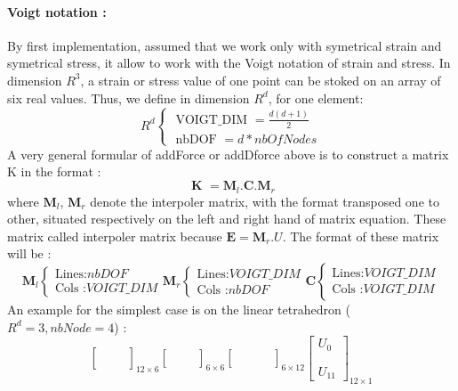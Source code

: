 \documentclass[a4paper,10pt]{article}
\begin{document}
\paragraph{Voigt notation :} By first implementation, assumed that we work only with symetrical strain and symetrical stress, it allow to work with the Voigt notation of strain and stress. In dimension $R^3$, a strain or stress value of one point can be stoked on an array of six real values. Thus, we define in dimension $R^d$, for one element:
\[
R^d
\left\{ 
\begin{array}{l}
 \text{ VOIGT\_DIM }   = \frac{d(d+1)}{2} \\
 \text{ nbDOF      }   = d*nbOfNodes  
\end{array}\right.
\]
A very general formular of addForce or addDforce above is to construct a matrix K in the format : 
\[
 \textbf{ K }   = \textbf{M}_l  . \textbf{C} . \textbf{M}_r
\]
where $\textbf{M}_l$, $\textbf{M}_r$ denote the interpoler matrix, with the format transposed one to other, situated respectively on the left and right hand of matrix equation. These matrix called interpoler matrix because $\textbf{E}=\textbf{M}_r.U$. The format of these matrix will be :
\[
\textbf{M}_l 
\left\{ 
\begin{array}{l}
\text{Lines:}       nbDOF        \\
\text{Cols :}       VOIGT\_DIM
\end{array}\right.
\textbf{M}_r 
\left\{ 
\begin{array}{l}
\text{Lines:}       VOIGT\_DIM  \\
\text{Cols :}       nbDOF
\end{array}\right.
\textbf{C} 
\left\{ 
\begin{array}{l}
\text{Lines:}       VOIGT\_DIM \\
\text{Cols :}       VOIGT\_DIM
\end{array}\right.
\]
An example for the simplest case is on the linear tetrahedron ($R^d=3, nbNode=4$) :
\[
\left[ 
\begin{array}{ccc}
  &  &     \\
  &  &     \\
  &  &     \\
  &  &     
\end{array}
\right]_{12\times6}
\left[ 
\begin{array}{ccc}
  &  &     \\
  &  &     \\
  &  &     
\end{array}
\right]_{6\times6}
\left[ 
\begin{array}{cccc}
  &  &  &   \\
  &  &  &   \\
  &  &  &   
\end{array}
\right]_{6\times12}
\left[ 
\begin{array}{c}
U_0  \\
     \\
     \\
U_{11}
\end{array}
\right]_{12\times1}
\]
\end{document}
